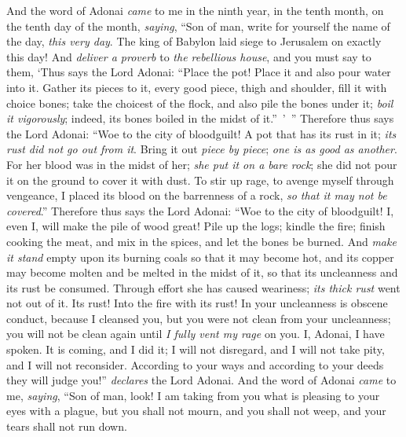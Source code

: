 \begin{biblechapter} %
 And the word of Adonai \textit{came} to me in the ninth year, in the tenth month, on the tenth day of the month, \textit{saying},
\verse “Son of man, write for yourself the name of the day, \textit{this very day}. The king of Babylon laid siege to Jerusalem on exactly this day!
\verse And \textit{deliver a proverb} to \textit{the rebellious house}, and you must say to them, ‘Thus says the Lord Adonai: “Place the pot! Place it and also pour water into it.
\verse Gather its pieces to it, every good piece, thigh and shoulder, fill it with choice bones;
\verse take the choicest of the flock, and also pile the bones under it; \textit{boil it vigorously}; indeed, its bones boiled in the midst of it.” ’ ”
\verse Therefore thus says the Lord Adonai: “Woe to the city of bloodguilt! A pot that has its rust in it; \textit{its rust did not go out from it}. Bring it out \textit{piece by piece}; \textit{one is as good as another}.
\verse For her blood was in the midst of her; \textit{she put it on a bare rock}; she did not pour it on the ground to cover it with dust.
\verse To stir up rage, to avenge myself through vengeance, I placed its blood on the barrenness of a rock, \textit{so that it may not be covered}.”
\verse Therefore thus says the Lord Adonai: “Woe to the city of bloodguilt! I, even I, will make the pile of wood great!
\verse Pile up the logs; kindle the fire; finish cooking the meat, and mix in the spices, and let the bones be burned.
\verse And \textit{make it stand} empty upon its burning coals so that it may become hot, and its copper may become molten and be melted in the midst of it, so that its uncleanness and its rust be consumed.
\verse Through effort she has caused weariness; \textit{its thick rust} went not out of it. Its rust! Into the fire with its rust!
\verse In your uncleanness is obscene conduct, because I cleansed you, but you were not clean from your uncleanness; you will not be clean again until \textit{I fully vent my rage} on you.
\verse I, Adonai, I have spoken. It is coming, and I did it; I will not disregard, and I will not take pity, and I will not reconsider. According to your ways and according to your deeds they will judge you!” \textit{declares} the Lord Adonai.
\verse And the word of Adonai \textit{came} to me, \textit{saying},
\verse “Son of man, look! I am taking from you what is pleasing to your eyes with a plague, but you shall not mourn, and you shall not weep, and your tears shall not run down.

\end{biblechapter}
